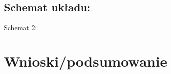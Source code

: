 \documentclass[12pt,a4paper]{article}
\begin{document}
		\subsection{Schemat układu:}
		
			\vspace{0.5cm}
			\begin{center}
				Schemat 2: 
			\end{center}

	\section{Wnioski/podsumowanie}
	
	
\end{document}
